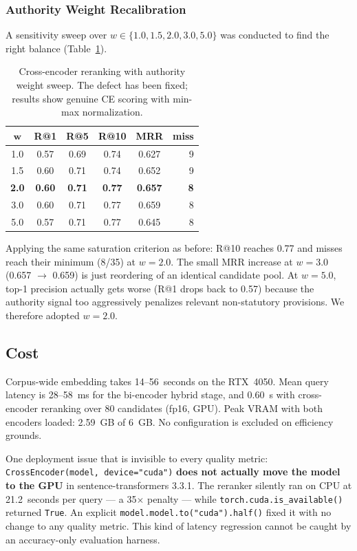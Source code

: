 \documentclass[11pt,a4paper,twocolumn]{article}
\begin{document}
\subsubsection{Authority Weight Recalibration}

A sensitivity sweep over $w \in \{1.0, 1.5, 2.0, 3.0, 5.0\}$ was conducted to find the right balance (Table~\ref{tab:rerank}).

\begin{table}[t]
\centering
\caption{Cross-encoder reranking with authority weight sweep. The defect has been fixed; results show genuine CE scoring with min-max normalization.}
\label{tab:rerank}
\small
\begin{tabular}{@{}cccccr@{}}
\toprule
$\boldsymbol{w}$ & \textbf{R@1} & \textbf{R@5} & \textbf{R@10} & \textbf{MRR} & \textbf{miss} \\
\midrule
1.0 & 0.57 & 0.69 & 0.74 & 0.627 & 9 \\
1.5 & 0.60 & 0.71 & 0.74 & 0.652 & 9 \\
\textbf{2.0} & \textbf{0.60} & \textbf{0.71} & \textbf{0.77} & \textbf{0.657} & \textbf{8} \\
3.0 & 0.60 & 0.71 & 0.77 & 0.659 & 8 \\
5.0 & 0.57 & 0.71 & 0.77 & 0.645 & 8 \\
\bottomrule
\end{tabular}
\end{table}

Applying the same saturation criterion as before: R@10 reaches 0.77 and misses reach their minimum (8/35) at $w{=}2.0$. The small MRR increase at $w{=}3.0$ (0.657 $\rightarrow$ 0.659) is just reordering of an identical candidate pool. At $w{=}5.0$, top-1 precision actually gets worse (R@1 drops back to 0.57) because the authority signal too aggressively penalizes relevant non-statutory provisions. We therefore adopted $w{=}2.0$.

\subsection{Cost}

Corpus-wide embedding takes 14--56~seconds on the RTX~4050. Mean query latency is 28--58~ms for the bi-encoder hybrid stage, and 0.60~s with cross-encoder reranking over 80 candidates (fp16, GPU). Peak VRAM with both encoders loaded: 2.59~GB of 6~GB. No configuration is excluded on efficiency grounds.

One deployment issue that is invisible to every quality metric: \texttt{CrossEncoder(model, device="cuda")} \textbf{does not actually move the model to the GPU} in sentence-transformers 3.3.1. The reranker silently ran on CPU at 21.2~seconds per query --- a 35$\times$ penalty --- while \texttt{torch.cuda.is\_available()} returned \texttt{True}. An explicit \texttt{model.model.to("cuda").half()} fixed it with no change to any quality metric. This kind of latency regression cannot be caught by an accuracy-only evaluation harness.
\end{document}
